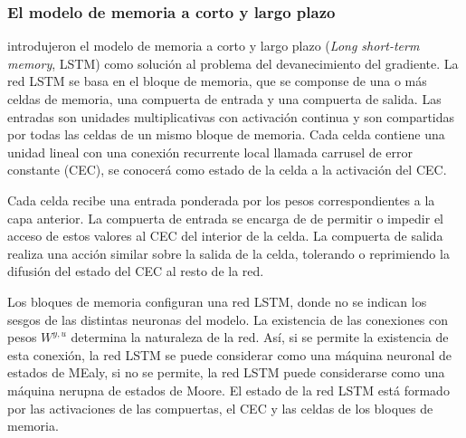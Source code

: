\subsubsection{El modelo de memoria a corto y largo plazo}
 introdujeron el modelo de memoria a corto y largo plazo ({\em Long short-term memory}, LSTM) como solución al problema del devanecimiento del gradiente. La red LSTM se basa en el bloque de memoria, que se componse de una o más celdas de memoria, una compuerta de entrada y una compuerta de salida. Las entradas son unidades multiplicativas con activación continua y son compartidas por todas las celdas de un mismo bloque de memoria. Cada celda contiene una unidad lineal con una conexión recurrente local llamada carrusel de error constante (CEC), se conocerá como estado de la celda a la activación del CEC.

Cada celda recibe una entrada ponderada por los pesos correspondientes a la capa anterior. La compuerta de entrada se encarga de de permitir o impedir el acceso de estos valores al CEC del interior de la celda. La compuerta de salida realiza una acción similar sobre la salida de la celda, tolerando o reprimiendo la difusión del estado del CEC al resto de la red.

Los bloques de memoria configuran una red LSTM, donde no se indican los sesgos de las distintas neuronas del modelo. La existencia de las conexiones con pesos $W^{y, u}$  determina la naturaleza de la red. Así, si se permite la existencia de esta conexión, la red LSTM se puede considerar como una máquina neuronal de estados de MEaly, si no se permite, la red LSTM puede considerarse como una máquina nerupna de estados de Moore. El estado de la red LSTM está formado por las activaciones de las compuertas, el CEC y las celdas de los bloques de memoria.





